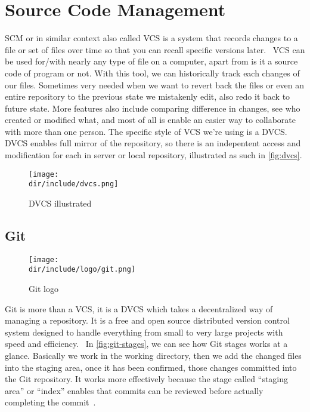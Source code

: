 \section{Source Code Management}
\label{sec:scm}

\ac{SCM} or in similar context also called \ac{VCS} is a system that records changes to a file or set of files over time so that you can recall specific versions later.~\autocite{Chacon:2014:ProGit:27}
\ac{VCS} can be used for/with nearly any type of file on a computer, apart from is it a source code of program or not.
With this tool, we can historically track each changes of our files.
Sometimes very needed when we want to revert back the files or even an entire repository to the previous state we mistakenly edit, also redo it back to future state.
More features also include comparing difference in changes, see who created or modified what, and most of all is enable an easier way to collaborate with more than one person.
The specific style of \ac{VCS} we're using is a \ac{DVCS}.
\ac{DVCS} enables full mirror of the repository, so there is an indepentent access and modification for each in server or local repository, illustrated as such in \autoref{fig:dvcs}.

\begin{figure}[htb]
    \centering
    \texttt{[image: \\dir/include/dvcs.png]}
    \caption[DVCS illustrated]{DVCS illustrated}
    \label{fig:dvcs}
\end{figure}

\subsection{Git}

\begin{wrapfigure}{r}{0.5\textwidth}
  \vspace{-20pt}
  \begin{center}
    \texttt{[image: \\dir/include/logo/git.png]}
  \end{center}
  \vspace{-20pt}
  \caption{Git logo}
  \label{fig:git-logo}
  \vspace{-10pt}
\end{wrapfigure}

Git is more than a \ac{VCS}, it is a \ac{DVCS} which takes a decentralized way of managing a repository.
It is a free and open source distributed version control system designed to handle everything from small to very large projects with speed and efficiency.~\autocite{Git2010}
In \autoref{fig:git-stages}, we can see how Git stages works at a glance.
Basically we work in the working directory, then we add the changed files into the staging area, once it has been confirmed, those changes committed into the Git repository.
It works more effectively because the stage called ``staging area'' or ``index'' enables that commits can be reviewed before actually completing the commit~\autocite{Git2010}.

